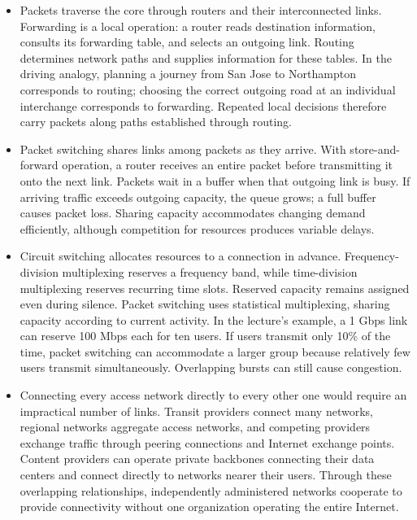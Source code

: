 \documentclass[10pt]{article}
\begin{document}
\begin{itemize}[leftmargin=1.25em, itemsep=0.3em, parsep=0pt, topsep=0pt]
    \item Packets traverse the core through routers and their interconnected links. Forwarding is a local operation: a router reads destination information, consults its forwarding table, and selects an outgoing link. Routing determines network paths and supplies information for these tables. In the driving analogy, planning a journey from San Jose to Northampton corresponds to routing; choosing the correct outgoing road at an individual interchange corresponds to forwarding. Repeated local decisions therefore carry packets along paths established through routing.

    \item Packet switching shares links among packets as they arrive. With store-and-forward operation, a router receives an entire packet before transmitting it onto the next link. Packets wait in a buffer when that outgoing link is busy. If arriving traffic exceeds outgoing capacity, the queue grows; a full buffer causes packet loss. Sharing capacity accommodates changing demand efficiently, although competition for resources produces variable delays.

    \item Circuit switching allocates resources to a connection in advance. Frequency-division multiplexing reserves a frequency band, while time-division multiplexing reserves recurring time slots. Reserved capacity remains assigned even during silence. Packet switching uses statistical multiplexing, sharing capacity according to current activity. In the lecture's example, a 1 Gbps link can reserve 100 Mbps each for ten users. If users transmit only 10\% of the time, packet switching can accommodate a larger group because relatively few users transmit simultaneously. Overlapping bursts can still cause congestion.

    \item Connecting every access network directly to every other one would require an impractical number of links. Transit providers connect many networks, regional networks aggregate access networks, and competing providers exchange traffic through peering connections and Internet exchange points. Content providers can operate private backbones connecting their data centers and connect directly to networks nearer their users. Through these overlapping relationships, independently administered networks cooperate to provide connectivity without one organization operating the entire Internet.
\end{itemize}
\end{document}
